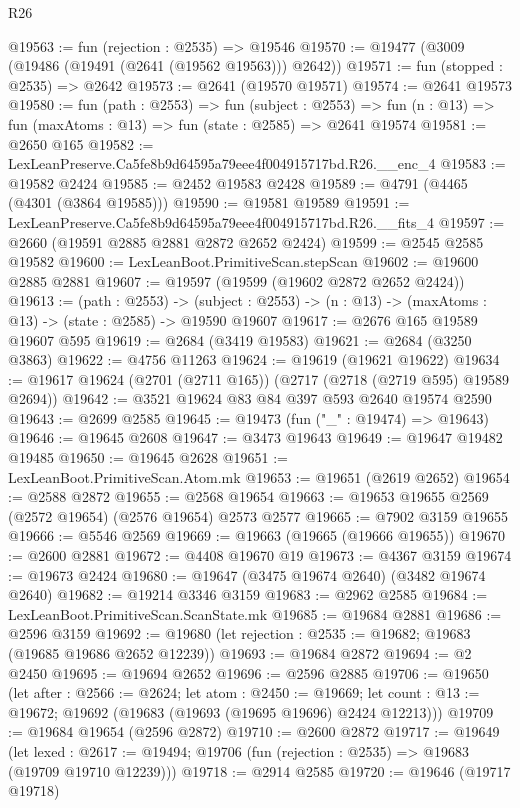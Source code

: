 \begin{lexlean}{R26}
\begin{coremodule}
@19563 := fun (rejection : @2535) => @19546
@19570 := @19477 (@3009 (@19486 (@19491 (@2641 (@19562 @19563))) @2642))
@19571 := fun (stopped : @2535) => @2642
@19573 := @2641 (@19570 @19571)
@19574 := @2641 @19573
@19580 := fun (path : @2553) =>
  fun (subject : @2553) =>
  fun (n : @13) => fun (maxAtoms : @13) => fun (state : @2585) => @2641 @19574
@19581 := @2650 @165
@19582 := LexLeanPreserve.Ca5fe8b9d64595a79eee4f004915717bd.R26.__enc_4
@19583 := @19582 @2424
@19585 := @2452 @19583 @2428
@19589 := @4791 (@4465 (@4301 (@3864 @19585)))
@19590 := @19581 @19589
@19591 := LexLeanPreserve.Ca5fe8b9d64595a79eee4f004915717bd.R26.__fits_4
@19597 := @2660 (@19591 @2885 @2881 @2872 @2652 @2424)
@19599 := @2545 @2585 @19582
@19600 := LexLeanBoot.PrimitiveScan.stepScan
@19602 := @19600 @2885 @2881
@19607 := @19597 (@19599 (@19602 @2872 @2652 @2424))
@19613 := (path : @2553) ->
  (subject : @2553) -> (n : @13) -> (maxAtoms : @13) -> (state : @2585) -> @19590 @19607
@19617 := @2676 @165 @19589 @19607 @595
@19619 := @2684 (@3419 @19583)
@19621 := @2684 (@3250 @3863)
@19622 := @4756 @11263
@19624 := @19619 (@19621 @19622)
@19634 := @19617 @19624 (@2701 (@2711 @165)) (@2717 (@2718 (@2719 @595) @19589 @2694))
@19642 := @3521 @19624 @83 @84 @397 @593 @2640 @19574 @2590
@19643 := @2699 @2585
@19645 := @19473 (fun ("_" : @19474) => @19643)
@19646 := @19645 @2608
@19647 := @3473 @19643
@19649 := @19647 @19482 @19485
@19650 := @19645 @2628
@19651 := LexLeanBoot.PrimitiveScan.Atom.mk
@19653 := @19651 (@2619 @2652)
@19654 := @2588 @2872
@19655 := @2568 @19654
@19663 := @19653 @19655 @2569 (@2572 @19654) (@2576 @19654) @2573 @2577
@19665 := @7902 @3159 @19655
@19666 := @5546 @2569
@19669 := @19663 (@19665 (@19666 @19655))
@19670 := @2600 @2881
@19672 := @4408 @19670 @19
@19673 := @4367 @3159
@19674 := @19673 @2424
@19680 := @19647 (@3475 @19674 @2640) (@3482 @19674 @2640)
@19682 := @19214 @3346 @3159
@19683 := @2962 @2585
@19684 := LexLeanBoot.PrimitiveScan.ScanState.mk
@19685 := @19684 @2881
@19686 := @2596 @3159
@19692 := @19680 (let rejection : @2535 := @19682; @19683 (@19685 @19686 @2652 @12239))
@19693 := @19684 @2872
@19694 := @2 @2450
@19695 := @19694 @2652
@19696 := @2596 @2885
@19706 := @19650
    (let after : @2566 := @2624;
    let atom : @2450 := @19669;
    let count : @13 := @19672; @19692 (@19683 (@19693 (@19695 @19696) @2424 @12213)))
@19709 := @19684 @19654 (@2596 @2872)
@19710 := @2600 @2872
@19717 := @19649
    (let lexed : @2617 := @19494; @19706 (fun (rejection : @2535) => @19683 (@19709 @19710 @12239)))
@19718 := @2914 @2585
@19720 := @19646 (@19717 @19718)

\end{coremodule}
\end{lexlean}
